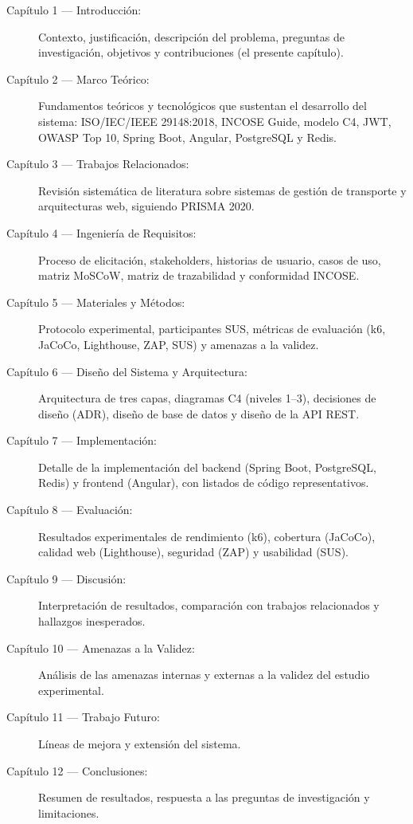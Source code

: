 \begin{description}
  \item[Capítulo 1 — Introducción:] Contexto, justificación, descripción del problema, preguntas de investigación, objetivos y contribuciones (el presente capítulo).

  \item[Capítulo 2 — Marco Teórico:] Fundamentos teóricos y tecnológicos que sustentan el desarrollo del sistema: ISO/IEC/IEEE 29148:2018, INCOSE Guide, modelo C4, JWT, OWASP Top 10, Spring Boot, Angular, PostgreSQL y Redis.

  \item[Capítulo 3 — Trabajos Relacionados:] Revisión sistemática de literatura sobre sistemas de gestión de transporte y arquitecturas web, siguiendo PRISMA 2020.

  \item[Capítulo 4 — Ingeniería de Requisitos:] Proceso de elicitación, stakeholders, historias de usuario, casos de uso, matriz MoSCoW, matriz de trazabilidad y conformidad INCOSE.

  \item[Capítulo 5 — Materiales y Métodos:] Protocolo experimental, participantes SUS, métricas de evaluación (k6, JaCoCo, Lighthouse, ZAP, SUS) y amenazas a la validez.

  \item[Capítulo 6 — Diseño del Sistema y Arquitectura:] Arquitectura de tres capas, diagramas C4 (niveles 1--3), decisiones de diseño (ADR), diseño de base de datos y diseño de la API REST.

  \item[Capítulo 7 — Implementación:] Detalle de la implementación del backend (Spring Boot, PostgreSQL, Redis) y frontend (Angular), con listados de código representativos.

  \item[Capítulo 8 — Evaluación:] Resultados experimentales de rendimiento (k6), cobertura (JaCoCo), calidad web (Lighthouse), seguridad (ZAP) y usabilidad (SUS).

  \item[Capítulo 9 — Discusión:] Interpretación de resultados, comparación con trabajos relacionados y hallazgos inesperados.

  \item[Capítulo 10 — Amenazas a la Validez:] Análisis de las amenazas internas y externas a la validez del estudio experimental.

  \item[Capítulo 11 — Trabajo Futuro:] Líneas de mejora y extensión del sistema.

  \item[Capítulo 12 — Conclusiones:] Resumen de resultados, respuesta a las preguntas de investigación y limitaciones.
\end{description}
